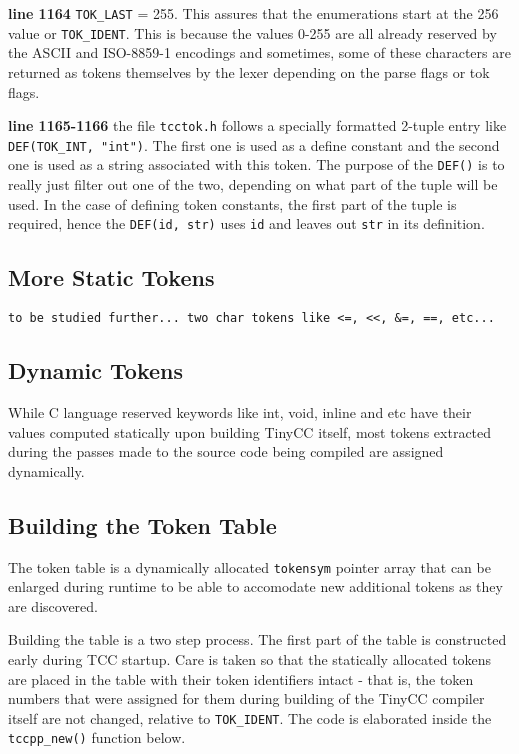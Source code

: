 \begin{tcc_desc}
\textbf{line 1164} \verb|TOK_LAST| = 255. This assures that the enumerations start at the 256 value or \verb|TOK_IDENT|. This is because the values 0-255 are all already reserved by the ASCII and ISO-8859-1 encodings and sometimes, some of these characters are returned as tokens themselves by the lexer depending on the parse flags or tok flags.

\textbf{line 1165-1166} the file \verb|tcctok.h| follows a specially formatted 2-tuple entry like \verb|DEF(TOK_INT, "int")|. The first one is used as a define constant and the second one is used as a string associated with this token. The purpose of the \verb|DEF()| is to really just filter out one of the two, depending on what part of the tuple will be used. In the case of defining token constants, the first part of the tuple is required, hence the \verb|DEF(id, str)| uses \verb|id| and leaves out \verb|str| in its definition.
\end{tcc_desc}

\subsection{More Static Tokens}

\begin{verbatim}
to be studied further... two char tokens like <=, <<, &=, ==, etc...
\end{verbatim}


\subsection{Dynamic Tokens}

While C language reserved keywords like int, void, inline and etc have their values computed statically upon building TinyCC itself, most tokens extracted during the passes made to the source code being compiled are assigned dynamically.


\subsection{Building the Token Table}

The token table is a dynamically allocated \verb|tokensym| pointer array that can be enlarged during runtime to be able to accomodate new additional tokens as they are discovered. 

Building the table is a two step process. The first part of the table is constructed early during TCC startup. Care is taken so that the statically allocated tokens are placed in the table with their token identifiers intact - that is, the token numbers that were assigned for them during building of the TinyCC compiler itself are not changed, relative to \verb|TOK_IDENT|. The code is elaborated inside the \verb|tccpp_new()| function below.

